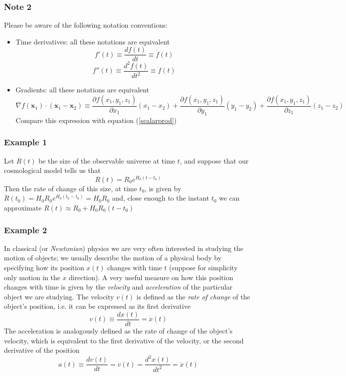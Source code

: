 \subsubsection{Note 2}
Please be aware of the following notation conventions:
\begin{itemize}
\item Time derivatives: all these notations are equivalent
\begin{equation}
f'(t)\equiv \frac{df(t)}{dt} \equiv \dot{f}(t)
\end{equation}
\begin{equation}
f''(t)\equiv \frac{d^2f(t)}{dt^2}\equiv \ddot{f}(t)
\end{equation}
\item Gradients: all these notations are equivalent 
\begin{equation}
\nabla f(\mathbf{x}_1)\cdot(\mathbf{x}_1-\mathbf{x}_2)\equiv \frac{\partial f(x_1,y_1,z_1)}{\partial x_1}(x_1-x_2)+\frac{\partial f(x_1,y_1,z_1)}{\partial y_1}(y_1-y_2)+\frac{\partial f(x_1,y_1,z_1)}{\partial z_1}(z_1-z_2)
\end{equation}
Compare this expression with equation (\ref{scalarprod})
\end{itemize}
\subsubsection{Example 1}
Let $R(t)$ be the size of the observable universe at time $t$, and suppose that our cosmological model tells us that 
\begin{equation}
R(t)=R_0e^{H_0(t-t_0)}
\end{equation}
Then the rate of change of this size, at time $t_0$, is given by $\dot{R}(t_0)=H_0R_0e^{H_0(t_0-t_0)}=H_0R_0$ and, close enough to the instant $t_0$ we can approximate $R(t)\approx R_0+H_0R_0(t-t_0)$
\subsubsection{Example 2}
In classical (or \textit{Newtonian}) physics we are very often interested in studying the motion of objects; we usually describe the motion of a physical body by specifying how its position $x(t)$ changes with time $t$ (suppose for simplicity only motion in the $x$ direction). A very useful measure on how this position changes with time is given by the \textit{velocity} and \textit{acceleration} of the particular object we are studying. The velocity $v(t)$ is defined as the \textit{rate of change} of the object's position, i.e. it can be expressed as its first derivative 
\begin{equation}
v(t)\equiv\frac{dx(t)}{dt}=\dot{x}(t)
\end{equation}
The acceleration is analogously defined as the rate of change of the object's velocity, which is equivalent to the first derivative of the velocity, or the second derivative of the position
\begin{equation}
a(t)\equiv \frac{dv(t)}{dt}=\dot{v}(t)=\frac{d^2x(t)}{dt^2}=\ddot{x}(t)
\end{equation}
